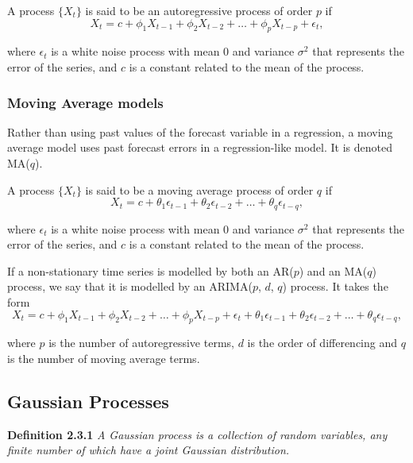          \vspace{1em}

         A process \(\{X_{t}\}\) is said to be an autoregressive process of order \(p\) if \[X_{t} = c + \phi_{1}X_{t-1} + \phi_{2}X_{t-2} + \ldots + \phi_{p}X_{t-p} + \epsilon_{t},\]

         where \(\epsilon_{t}\) is a white noise process with mean 0 and variance \(\sigma^2\) that represents the error of the series, and \(c\) is a constant related to the mean of the process.

      \subsubsection{Moving Average models}

         Rather than using past values of the forecast variable in a regression, a moving average model uses past forecast errors in a regression-like model. It is denoted MA(\(q\)).

         \vspace{1em}

         A process \(\{X_{t}\}\) is said to be a moving average process of order \(q\) if \[X_{t} = c + \theta_{1} \epsilon_{t-1} +  \theta_{2} \epsilon_{t-2} + \ldots +  \theta_{q} \epsilon_{t-q},\]
         
         where \(\epsilon_{t}\) is a white noise process with mean 0 and variance \(\sigma^2\) that represents the error of the series, and \(c\) is a constant related to the mean of the process.
      
      \vspace{1em}

      If a non-stationary time series is modelled by both an AR(\(p\)) and an MA(\(q\)) process, we say that it is modelled by an ARIMA(\(p\), \(d\), \(q\)) process. It takes the form \[X_{t} = c + \phi_{1}X_{t-1} + \phi_{2}X_{t-2} + \ldots + \phi_{p}X_{t-p} + \epsilon_{t} + \theta_{1} \epsilon_{t-1} +  \theta_{2} \epsilon_{t-2} + \ldots +  \theta_{q} \epsilon_{t-q},\]

      where \(p\) is the number of autoregressive terms, \(d\) is the order of differencing and \(q\) is the number of moving average terms.

   \subsection{Gaussian Processes}

      \textbf{Definition 2.3.1} \cite{Rasmussen2006} \textit{A Gaussian process is a collection of random variables, any finite number of which have a joint Gaussian distribution.}

